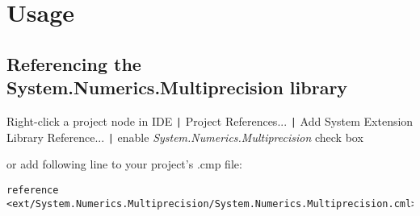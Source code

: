\chapter{Usage}

\section{Referencing the System.Numerics.Multiprecision library}

Right-click a project node in IDE \verb.|. Project References... \verb.|.
Add System Extension Library Reference... \verb.|.
enable \emph{System.Numerics.Multiprecision} check box

\begin{flushleft}
or add following line to your project's .cmp file:
\begin{verbatim}
reference <ext/System.Numerics.Multiprecision/System.Numerics.Multiprecision.cml>;
\end{verbatim}
\end{flushleft}
